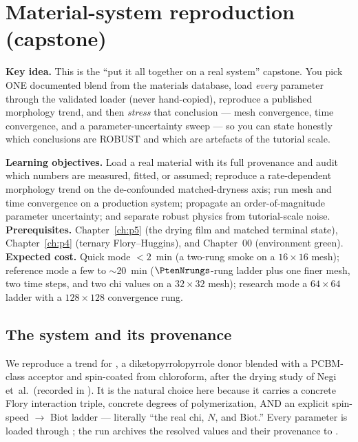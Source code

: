 \chapter{Material-system reproduction (capstone)}
\label{ch:p10}

\begin{keybox}
\textbf{Key idea.} This is the ``put it all together on a real system''
capstone. You pick ONE documented blend from the materials database, load
\emph{every} parameter through the validated loader (never hand-copied),
reproduce a published morphology trend, and then \emph{stress} that
conclusion --- mesh convergence, time convergence, and a parameter-uncertainty
sweep --- so you can state honestly which conclusions are ROBUST and which are
artefacts of the tutorial scale.
\end{keybox}

\begin{keybox}
\textbf{Learning objectives.} Load a real material with its full provenance and
audit which numbers are measured, fitted, or assumed; reproduce a
rate-dependent morphology trend on the de-confounded matched-dryness axis;
run mesh and time convergence on a production system; propagate an
order-of-magnitude parameter uncertainty; and separate robust physics from
tutorial-scale noise.\\[2pt]
\textbf{Prerequisites.} Chapter~\ref{ch:p5} (the drying film and matched
terminal state), Chapter~\ref{ch:p4} (ternary Flory--Huggins), and
Chapter~00 (environment green).\\[2pt]
\textbf{Expected cost.} Quick mode $<2$~min (a two-rung smoke on a $16\times16$
mesh); reference mode a few to $\sim$20~min ($\PtenNrungs$-rung ladder plus one
finer mesh, two time steps, and two chi values on a $32\times32$ mesh);
research mode a $64\times64$ ladder with a $128\times128$ convergence rung.
\end{keybox}

\section{The system and its provenance}

We reproduce a trend for \textbf{\PtenSystem}, a diketopyrrolopyrrole
donor blended with a PCBM-class acceptor and spin-coated from chloroform,
after the drying study of Negi et~al.\ (recorded in ).
It is the natural choice here because it carries a concrete Flory
interaction triple, concrete degrees of polymerization, AND an explicit
spin-speed $\rightarrow$ Biot ladder --- literally ``the real chi, $N$, and
Biot.'' Every parameter is loaded through ; the run
archives the resolved values and their provenance to
.

